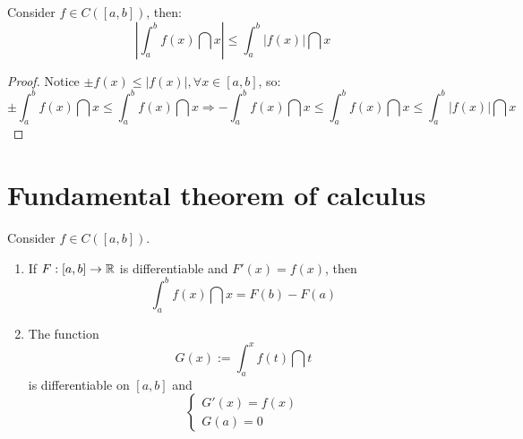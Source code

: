 \begin{theorem}
    Consider $f \in C([a,b])$, then:
    \begin{equation*}
        \left |
            \int_a^b f(x) \dint x
        \right | \leq
        \int_a^b |f(x)| \dint x
    \end{equation*}
\end{theorem}

\begin{proof}
    Notice $\pm f(x) \leq |f(x)|, \forall x \in [a,b]$, so:
    \begin{equation*}
        \pm \int_a^b f(x) \dint x \leq \int_a^b f(x) \dint x \Longrightarrow -\int_a^b f(x) \dint x \leq \int_a^b f(x) \dint x \leq \int_a^b |f(x)| \dint x 
    \end{equation*}
\end{proof}

\section{Fundamental theorem of calculus}

\begin{theorem}
    Consider $f \in C([a,b])$.
    \begin{enumerate}
        \item If $F:[a,b] \to \mathbb{R}$ is differentiable and $F'(x) = f(x)$, then
            \begin{equation*}
                \int_a^b f(x) \dint x = F(b) - F(a)
            \end{equation*}
        \item The function 
            \begin{equation*}
                G(x) := \int_a^x f(t) \dint t
            \end{equation*}
            is differentiable on $[a,b]$ and
            \begin{equation*}
                \begin{cases}
                    G'(x) = f(x) \\
                    G(a) = 0
                \end{cases}
            \end{equation*} 
    \end{enumerate}
\end{theorem}

